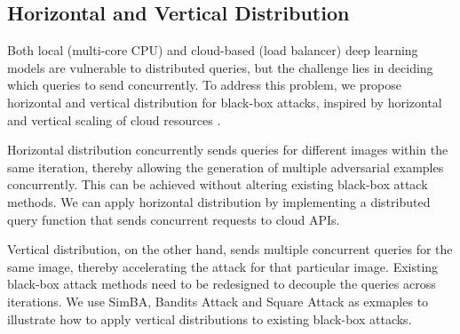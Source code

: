 

\subsection{Horizontal and Vertical Distribution}
\label{horizon_vertical}

Both local (multi-core CPU) and cloud-based (load balancer) deep learning models are vulnerable to distributed queries, but the challenge lies in deciding which queries to send concurrently. To address this problem, we propose horizontal and vertical distribution for black-box attacks, inspired by horizontal and vertical scaling of cloud resources \citep{Millnert2020}.

Horizontal distribution concurrently sends queries for different images within the same iteration, thereby allowing the generation of multiple adversarial examples concurrently. This can be achieved without altering existing black-box attack methods. We can apply horizontal distribution by implementing a distributed query function that sends concurrent requests to cloud APIs. 

Vertical distribution, on the other hand, sends multiple concurrent queries for the same image, thereby accelerating the attack for that particular image. Existing black-box attack methods need to be redesigned to decouple the queries across iterations. We use SimBA, Bandits Attack and Square Attack as exmaples to illustrate how to apply vertical distributions to existing black-box attacks.

